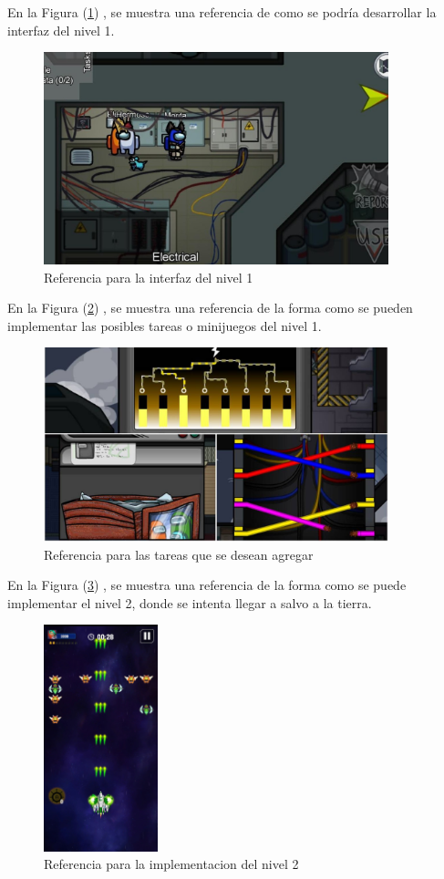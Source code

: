 \documentclass{article}
\begin{document}
En la Figura (\ref{fig:among}) \cite{amongus} , se muestra una referencia de como se podría desarrollar la interfaz del nivel 1.

\begin{figure}[h]
\includegraphics[width=10cm]{Among.jpg}
\centering
\caption{Referencia para la interfaz del nivel 1}
\label{fig:among}
\end{figure}

En la Figura (\ref{fig:tareas}) \cite{tareas} , se muestra una referencia de la forma como se pueden implementar las posibles tareas o minijuegos del nivel 1.

\begin{figure}[h]
\includegraphics[width=10cm]{Tareas.jpg}
\centering
\caption{Referencia para las tareas que se desean agregar}
\label{fig:tareas}
\end{figure}

\newpage

En la Figura (\ref{fig:nivel2}) \cite{space} , se muestra una referencia de la forma como se puede implementar el nivel 2, donde se intenta llegar a salvo a la tierra.

\begin{figure}[h]
\includegraphics[width=3.3cm]{Nivel 2.jpg}
\centering
\caption{Referencia para la implementacion del nivel 2}
\label{fig:nivel2}
\end{figure}
\end{document}
